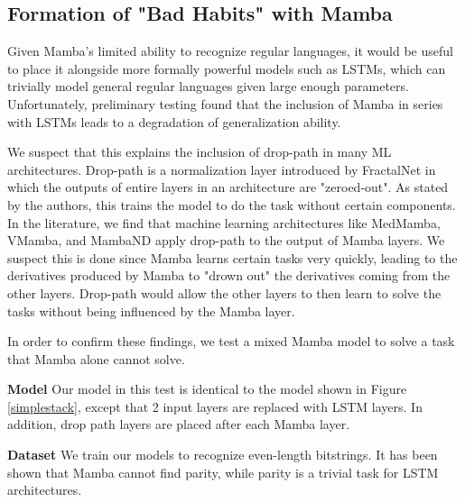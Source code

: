 \subsection{Formation of "Bad Habits" with Mamba}
Given Mamba's limited ability to recognize regular languages, it would be useful
to place it alongside more formally powerful models such as LSTMs, which can
trivially model general regular languages given large enough
parameters\cite{lstmformal}. Unfortunately, preliminary testing found that the
inclusion of Mamba in series with LSTMs leads to a degradation of generalization
ability.

We suspect that this explains the inclusion of drop-path in many ML
architectures.
Drop-path is a normalization layer introduced by FractalNet\cite{fractalnet} in
which the outputs of entire layers in an architecture are "zeroed-out".
As stated by the authors, this trains the model to do the task without certain
components.
In the literature, we find that machine learning architectures like
MedMamba\cite{medmamba}, VMamba\cite{vmamba}, and MambaND\cite{mamband} apply
drop-path to the output of Mamba layers.
We suspect this is done since Mamba learns certain tasks very quickly, leading to
the derivatives produced by Mamba to "drown out" the derivatives coming from the
other layers.
Drop-path would allow the other layers to then learn to solve the tasks without
being influenced by the Mamba layer.

In order to confirm these findings, we test a mixed Mamba model to solve a task
that Mamba alone cannot solve.

\textbf{Model} Our model in this test is identical to the model shown in
Figure \ref{simplestack}, except that 2 input layers are replaced with LSTM
layers.
In addition, drop path layers are placed after each Mamba layer.

\textbf{Dataset} We train our models to recognize even-length bitstrings.
It has been shown that Mamba cannot find parity\cite{ssmformal}, while parity
is a trivial task for LSTM architectures.

